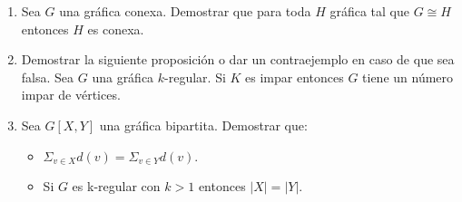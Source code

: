 \documentclass[12pts]{report}
\begin{document}
\begin{enumerate}
\item Sea $G$ una gráfica conexa. Demostrar que para toda $H$ gráfica tal que $G\cong H$ entonces $H$ es conexa.

\item Demostrar la siguiente proposición o dar un contraejemplo en caso de que sea falsa. 
Sea $G$ una gráfica $k$-regular. Si $K$ es impar entonces $G$ tiene un número impar de vértices.

\item Sea $G[X,Y]$ una gráfica bipartita. Demostrar que:
\begin{itemize}
\item $\Sigma_{v\in X} d(v) = \Sigma_{v\in Y} d(v)$.
\item Si $G$ es k-regular con $k>1$ entonces $|X|=|Y|$.
\end{itemize}
\end{enumerate}
\end{document}
